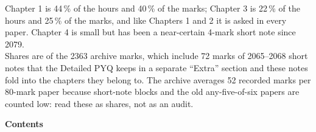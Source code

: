 \documentclass[10pt]{article}
\begin{document}
\par{}\vspace{10pt}
\begin{center}
\begin{minipage}{0.86\textwidth}\small\color{sub}
 Chapter 1 is 44\,\% of the hours and 40\,\% of the marks;
Chapter 3 is 22\,\% of the hours and 25\,\% of the marks, and like Chapters 1 and 2 it is
asked in every paper. Chapter 4 is small but has been a near-certain 4-mark short note since 2079.\\[6pt]
Shares are of the 2363 archive marks, which include 72 marks of 2065--2068 short notes that
the Detailed PYQ keeps in a separate ``Extra'' section and these notes fold into the chapters
they belong to. The archive averages 52 recorded marks per 80-mark paper because short-note
blocks and the old any-five-of-six papers are counted low: read these as shares, not as an
audit.
\end{minipage}
\end{center}
\vspace{1.2cm}

\cleardoublepage
\pagestyle{fancy}
{\Large\bfseries\color{acc} Contents}
\vspace{-6pt}{\color{acc}\rule{\textwidth}{1.1pt}}\vspace{4pt}
\begingroup
\renewcommand{\contentsname}{}
\setcounter{tocdepth}{1}
\vspace{-24pt}
\tableofcontents
\endgroup

\cleardoublepage

\cleardoublepage

\cleardoublepage

\cleardoublepage

\cleardoublepage




\cleardoublepage
{}
{}

\end{document}
